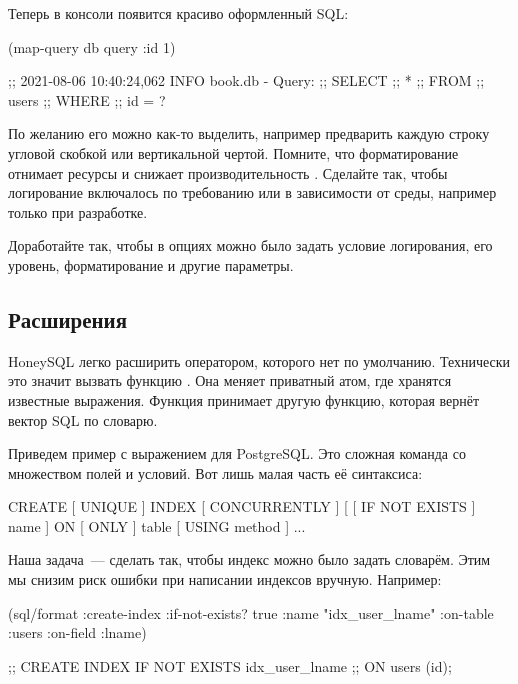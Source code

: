 Теперь в консоли появится красиво оформленный SQL:

\begin{english}
  \begin{clojure}
(map-query db query {:id 1})

;; 2021-08-06 10:40:24,062 INFO  book.db - Query:
;; SELECT
;;  *
;; FROM
;;   users
;; WHERE
;;  id = ?
  \end{clojure}
\end{english}

По желанию его можно как-то выделить, например предварить каждую строку угловой скобкой или вертикальной чертой. Помните, что форматирование отнимает ресурсы и снижает производительность . Сделайте так, чтобы логирование включалось по требованию или в зависимости от среды, например только при разработке.

Доработайте  так, чтобы в опциях можно было задать условие логирования, его уровень, форматирование и другие параметры.

\subsection{Расширения}


HoneySQL легко расширить оператором, которого нет по умолчанию. Технически это значит вызвать функцию . Она меняет приватный атом, где хранятся известные выражения. Функция принимает другую функцию, которая вернёт вектор SQL по словарю.

Приведем пример с выражением  для PostgreSQL. Это сложная команда со множеством полей и условий. Вот лишь малая часть её синтаксиса:

\begin{english}
  \begin{sql}
CREATE [ UNIQUE ]
    INDEX [ CONCURRENTLY ]
    [ [ IF NOT EXISTS ] name ]
    ON [ ONLY ] table
    [ USING method ]
    ...
  \end{sql}
\end{english}

Наша задача~--- сделать так, чтобы индекс можно было задать словарём. Этим мы снизим риск ошибки при написании индексов вручную. Например:

\begin{english}
  \begin{clojure}
(sql/format
  {:create-index
    {:if-not-exists? true
     :name "idx_user_lname"
     :on-table :users
     :on-field :lname}})

;; CREATE INDEX IF NOT EXISTS idx_user_lname
;; ON users (id);
  \end{clojure}
\end{english}

